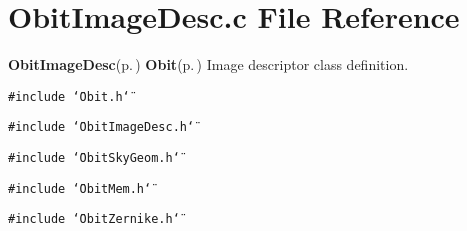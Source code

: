 \section{Obit\-Image\-Desc.c File Reference}
\label{ObitImageDesc_8c}
{\bf Obit\-Image\-Desc}{\rm (p.\,\pageref{structObitImageDesc})} {\bf Obit}{\rm (p.\,\pageref{structObit})} Image descriptor class definition. 

{\tt \#include \char`\"{}Obit.h\char`\"{}}\par
{\tt \#include \char`\"{}Obit\-Image\-Desc.h\char`\"{}}\par
{\tt \#include \char`\"{}Obit\-Sky\-Geom.h\char`\"{}}\par
{\tt \#include \char`\"{}Obit\-Mem.h\char`\"{}}\par
{\tt \#include \char`\"{}Obit\-Zernike.h\char`\"{}}\par
